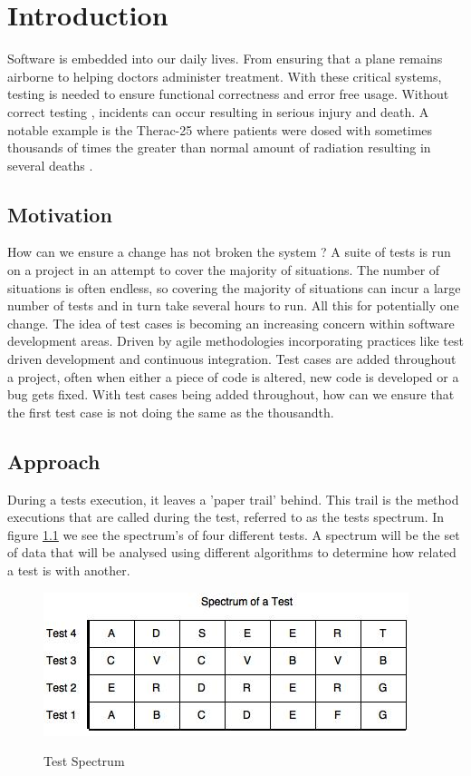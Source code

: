 \chapter{Introduction}\label{C:intro}
Software is embedded into our daily lives. From ensuring that a plane remains airborne to helping doctors administer treatment. With these critical systems, testing is needed to ensure functional correctness and error free usage. Without correct testing , incidents can occur resulting in serious injury and death. A notable example is the Therac-25 where patients were dosed with sometimes thousands of times the greater than normal amount of radiation resulting in several deaths \cite{therac}.

\section{Motivation}
How can we ensure a change has not broken the system ? A suite of tests is run on a project in an attempt to cover the majority of situations. The number of situations is often endless, so covering the majority of situations can incur a large number of tests and in turn take several hours to run. All this for potentially one change. The idea of test cases is becoming an increasing concern within software development areas. Driven by agile methodologies incorporating practices like test driven development and continuous integration.
Test cases are added throughout a project, often when either a piece of code is altered, new code is developed or a bug gets fixed. With test cases being added throughout, how can we ensure that the first test case is not doing the same as the thousandth.

\section{Approach}

During a tests execution, it leaves a 'paper trail' behind. This trail is the method executions that are called during the test, referred to as the tests spectrum. In figure \ref{fig:spectrum} we see the spectrum's of four different tests. A spectrum will be the set of data that will be analysed using different algorithms to determine how related a test is with another.

\begin{figure}[h]
\caption{Test Spectrum}
\includegraphics[]{Spectrum.jpg}
\label{fig:spectrum}
\end{figure}

